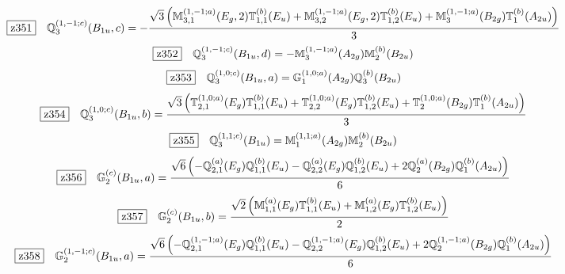 \documentclass[fleqn,10pt,landscape]{jsarticle}
\begin{document}
\begin{dmath*}
\hspace*{3mm}\fbox{z351}\quad \mathbb{Q}_{3}^{(1,-1;c)}(B_{1u},c)=- \frac{\sqrt{3} \left(\mathbb{M}_{3,1}^{(1,-1;a)}(E_{g},2) \mathbb{T}_{1,1}^{(b)}(E_{u}) + \mathbb{M}_{3,2}^{(1,-1;a)}(E_{g},2) \mathbb{T}_{1,2}^{(b)}(E_{u}) + \mathbb{M}_{3}^{(1,-1;a)}(B_{2g}) \mathbb{T}_{1}^{(b)}(A_{2u})\right)}{3}
\end{dmath*}
\begin{dmath*}
\hspace*{3mm}\fbox{z352}\quad \mathbb{Q}_{3}^{(1,-1;c)}(B_{1u},d)=- \mathbb{M}_{3}^{(1,-1;a)}(A_{2g}) \mathbb{M}_{2}^{(b)}(B_{2u})
\end{dmath*}
\begin{dmath*}
\hspace*{3mm}\fbox{z353}\quad \mathbb{Q}_{3}^{(1,0;c)}(B_{1u},a)=\mathbb{G}_{1}^{(1,0;a)}(A_{2g}) \mathbb{Q}_{3}^{(b)}(B_{2u})
\end{dmath*}
\begin{dmath*}
\hspace*{3mm}\fbox{z354}\quad \mathbb{Q}_{3}^{(1,0;c)}(B_{1u},b)=\frac{\sqrt{3} \left(\mathbb{T}_{2,1}^{(1,0;a)}(E_{g}) \mathbb{T}_{1,1}^{(b)}(E_{u}) + \mathbb{T}_{2,2}^{(1,0;a)}(E_{g}) \mathbb{T}_{1,2}^{(b)}(E_{u}) + \mathbb{T}_{2}^{(1,0;a)}(B_{2g}) \mathbb{T}_{1}^{(b)}(A_{2u})\right)}{3}
\end{dmath*}
\begin{dmath*}
\hspace*{3mm}\fbox{z355}\quad \mathbb{Q}_{3}^{(1,1;c)}(B_{1u})=\mathbb{M}_{1}^{(1,1;a)}(A_{2g}) \mathbb{M}_{2}^{(b)}(B_{2u})
\end{dmath*}
\begin{dmath*}
\hspace*{3mm}\fbox{z356}\quad \mathbb{G}_{2}^{(c)}(B_{1u},a)=\frac{\sqrt{6} \left(- \mathbb{Q}_{2,1}^{(a)}(E_{g}) \mathbb{Q}_{1,1}^{(b)}(E_{u}) - \mathbb{Q}_{2,2}^{(a)}(E_{g}) \mathbb{Q}_{1,2}^{(b)}(E_{u}) + 2 \mathbb{Q}_{2}^{(a)}(B_{2g}) \mathbb{Q}_{1}^{(b)}(A_{2u})\right)}{6}
\end{dmath*}
\begin{dmath*}
\hspace*{3mm}\fbox{z357}\quad \mathbb{G}_{2}^{(c)}(B_{1u},b)=\frac{\sqrt{2} \left(\mathbb{M}_{1,1}^{(a)}(E_{g}) \mathbb{T}_{1,1}^{(b)}(E_{u}) + \mathbb{M}_{1,2}^{(a)}(E_{g}) \mathbb{T}_{1,2}^{(b)}(E_{u})\right)}{2}
\end{dmath*}
\begin{dmath*}
\hspace*{3mm}\fbox{z358}\quad \mathbb{G}_{2}^{(1,-1;c)}(B_{1u},a)=\frac{\sqrt{6} \left(- \mathbb{Q}_{2,1}^{(1,-1;a)}(E_{g}) \mathbb{Q}_{1,1}^{(b)}(E_{u}) - \mathbb{Q}_{2,2}^{(1,-1;a)}(E_{g}) \mathbb{Q}_{1,2}^{(b)}(E_{u}) + 2 \mathbb{Q}_{2}^{(1,-1;a)}(B_{2g}) \mathbb{Q}_{1}^{(b)}(A_{2u})\right)}{6}
\end{dmath*}
\end{document}
